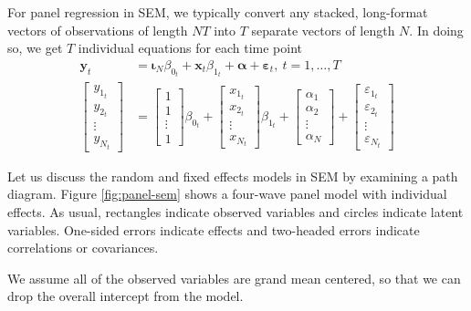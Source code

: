 \documentclass[]{interact}
\theoremstyle{plain}%
\theoremstyle{definition}
\theoremstyle{remark}
\begin{document}
For panel regression in SEM, we typically convert any stacked,
long-format vectors of observations of length \(NT\) into \(T\) separate
vectors of length \(N\). In doing so, we get \(T\) individual equations
for each time point \begin{align}
\bm{y}_{t} & = \bm{\iota}_{N}\beta_{0_{t}} + \bm{x}_{t}\beta_{1_{t}} + \bm{\alpha} + \bm{\varepsilon}_{t}, \ t = 1, \ldots, T \\
\begin{bmatrix}
y_{1_{t}} \\
y_{2_{t}} \\
\vdots \\
y_{N_{t}}
\end{bmatrix} & = 
\begin{bmatrix}
1 \\
1 \\ 
\vdots \\
1
\end{bmatrix} \beta_{0_{t}} + 
\begin{bmatrix}
x_{1_{t}} \\
x_{2_{t}} \\
\vdots \\
x_{N_{t}}
\end{bmatrix} \beta_{1_{t}} + 
\begin{bmatrix}
\alpha_{1} \\
\alpha_{2} \\
\vdots \\
\alpha_{N}
\end{bmatrix} + 
\begin{bmatrix}
\varepsilon_{1_{t}} \\
\varepsilon_{2_{t}} \\
\vdots \\
\varepsilon_{N_{t}}
\end{bmatrix}
\end{align}

Let us discuss the random and fixed effects models in SEM by examining a
path diagram. Figure \ref{fig:panel-sem} shows a four-wave panel model
with individual effects. As usual, rectangles indicate observed
variables and circles indicate latent variables. One-sided errors
indicate effects and two-headed errors indicate correlations or
covariances.

We assume all of the observed variables are grand mean centered, so that
we can drop the overall intercept from the model.
\end{document}
